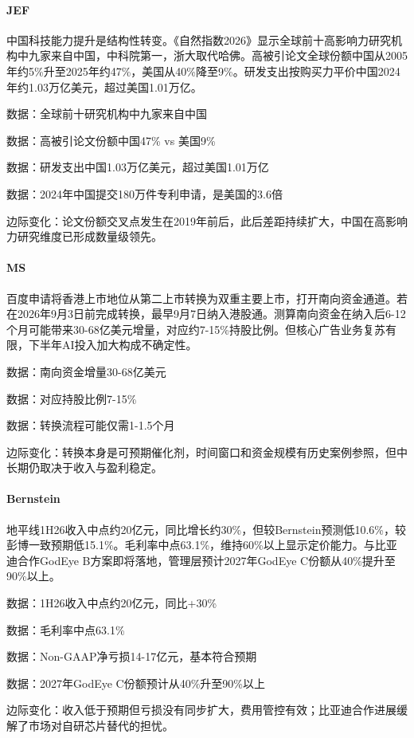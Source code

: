 \documentclass[11pt]{ctexart}
\begin{document}
\paragraph{JEF} 中国科技能力提升是结构性转变。《自然指数2026》显示全球前十高影响力研究机构中九家来自中国，中科院第一，浙大取代哈佛。高被引论文全球份额中国从2005年约5\%升至2025年约47\%，美国从40\%降至9\%。研发支出按购买力平价中国2024年约1.03万亿美元，超过美国1.01万亿。
{\small\color{refgray}数据：全球前十研究机构中九家来自中国\par}
{\small\color{refgray}数据：高被引论文份额中国47\% vs 美国9\%\par}
{\small\color{refgray}数据：研发支出中国1.03万亿美元，超过美国1.01万亿\par}
{\small\color{refgray}数据：2024年中国提交180万件专利申请，是美国的3.6倍\par}
{\small\color{refgray}边际变化：论文份额交叉点发生在2019年前后，此后差距持续扩大，中国在高影响力研究维度已形成数量级领先。\par}
\paragraph{MS} 百度申请将香港上市地位从第二上市转换为双重主要上市，打开南向资金通道。若在2026年9月3日前完成转换，最早9月7日纳入港股通。测算南向资金在纳入后6-12个月可能带来30-68亿美元增量，对应约7-15\%持股比例。但核心广告业务复苏有限，下半年AI投入加大构成不确定性。
{\small\color{refgray}数据：南向资金增量30-68亿美元\par}
{\small\color{refgray}数据：对应持股比例7-15\%\par}
{\small\color{refgray}数据：转换流程可能仅需1-1.5个月\par}
{\small\color{refgray}边际变化：转换本身是可预期催化剂，时间窗口和资金规模有历史案例参照，但中长期仍取决于收入与盈利稳定。\par}
\paragraph{Bernstein} 地平线1H26收入中点约20亿元，同比增长约30\%，但较Bernstein预测低10.6\%，较彭博一致预期低15.1\%。毛利率中点63.1\%，维持60\%以上显示定价能力。与比亚迪合作GodEye B方案即将落地，管理层预计2027年GodEye C份额从40\%提升至90\%以上。
{\small\color{refgray}数据：1H26收入中点约20亿元，同比+30\%\par}
{\small\color{refgray}数据：毛利率中点63.1\%\par}
{\small\color{refgray}数据：Non-GAAP净亏损14-17亿元，基本符合预期\par}
{\small\color{refgray}数据：2027年GodEye C份额预计从40\%升至90\%以上\par}
{\small\color{refgray}边际变化：收入低于预期但亏损没有同步扩大，费用管控有效；比亚迪合作进展缓解了市场对自研芯片替代的担忧。\par}
\end{document}
